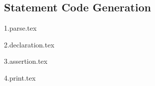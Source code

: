 
\subsection{Statement Code Generation}
{
	\lipsum[1]
	
	{1.parse.tex}
	
	{2.declaration.tex}
	
	{3.assertion.tex}
	
	{4.print.tex}
}
